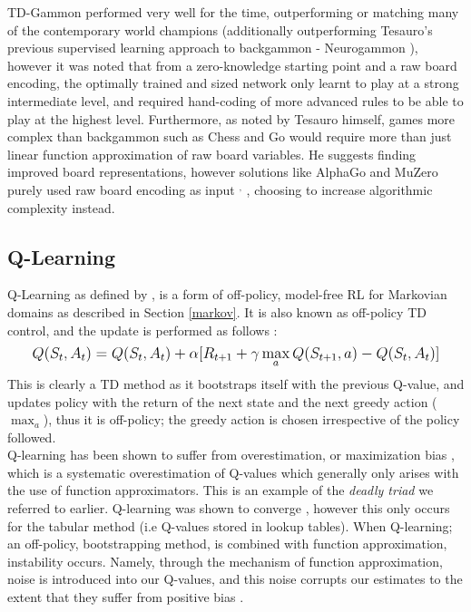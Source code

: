 \documentclass[12pt]{article}
\begin{document}
TD-Gammon performed very well for the time, outperforming or matching many of the contemporary world champions \autocite{tesauro1995temporal} (additionally outperforming Tesauro's previous supervised learning approach to backgammon - Neurogammon \autocite{DBLP:journals/corr/abs-1812-02648}), however it was noted that from a zero-knowledge starting point and a raw board encoding, the optimally trained and sized network only learnt to play at a strong intermediate level, and required hand-coding of more advanced rules to be able to play at the highest level. Furthermore, as noted by Tesauro himself, games more complex than backgammon such as Chess and Go would require more than just linear function approximation of raw board variables. He suggests finding improved board representations, however solutions like AlphaGo and MuZero purely used raw board encoding as input \autocite{MuZero}$^,$ \autocite{Silver2017}, choosing to increase algorithmic complexity instead. 
\subsection{Q-Learning}\label{qlearn} 

Q-Learning as defined by \textcite{watkins1992q}, is a form of off-policy, model-free RL for Markovian domains as described in Section \ref{markov}. It is also known as off-policy TD control, and the update is performed as follows  \autocite{watkins1992q}: 
\begin{equation}
    \mathlarger{
        Q(S_t,A_t) = Q(S_t,A_t) + \alpha[R_{t+1} + \gamma\max_{a}Q(S_{t+1},a)-Q(S_t,A_t)]
    }
\end{equation}
This is clearly a TD method as it bootstraps itself with the previous Q-value, and updates policy with the return of the next state and the next greedy action ($\max_{a}$), thus it is off-policy; the greedy action is chosen irrespective of the policy followed. \\\newline
Q-learning has been shown to suffer from overestimation, or maximization bias \autocite{thrun1993issues}, which is a systematic overestimation of Q-values which generally only arises with the use of function approximators. This is an example of the \textit{deadly triad} we referred to earlier. Q-learning was shown to converge \autocite{watkins1992q}, however this only occurs for the tabular method (i.e Q-values stored in lookup tables). When Q-learning; an off-policy, bootstrapping method, is combined with function approximation, instability occurs. Namely, through the mechanism of function approximation, noise is introduced into our Q-values, and this noise corrupts our estimates to the extent that they suffer from positive bias \autocite{thrun1993issues,rlintrochap6}.
\end{document}
